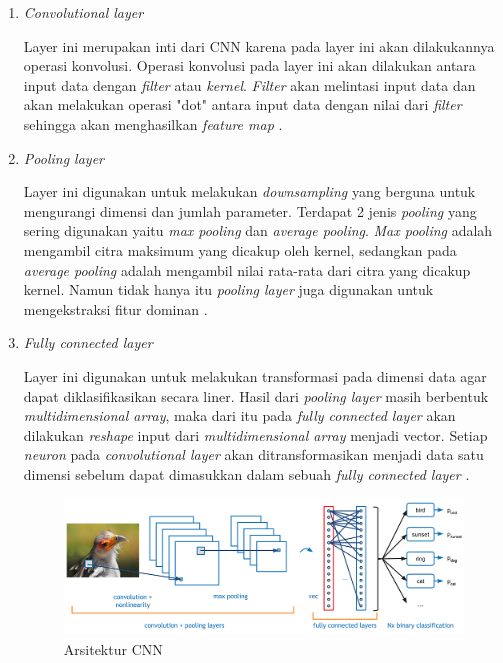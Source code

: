 \begin{enumerate}
  \item \textit{Convolutional layer} \par
  Layer ini merupakan inti dari CNN karena pada layer ini akan dilakukannya operasi konvolusi. Operasi konvolusi pada layer ini akan dilakukan antara input data dengan \textit{filter} atau \textit{kernel}. \textit{Filter} akan melintasi input data dan akan melakukan operasi "dot" antara input data dengan nilai dari \textit{filter} sehingga akan menghasilkan \textit{feature map} \parencite{LinaQ}.
  
  \item \textit{Pooling layer} \par
  Layer ini digunakan untuk melakukan \textit{downsampling} yang berguna untuk mengurangi dimensi dan jumlah parameter. Terdapat 2 jenis \textit{pooling} yang sering digunakan yaitu \textit{max pooling} dan  \textit{average pooling}. \textit{Max pooling} adalah mengambil citra maksimum yang dicakup oleh kernel, sedangkan pada \textit{average pooling} adalah mengambil nilai rata-rata dari citra yang dicakup kernel.
  Namun tidak hanya itu \textit{pooling layer} juga digunakan untuk mengekstraksi fitur dominan \parencite{Bukusakti}. 

  \item \textit{Fully connected layer} \par
  Layer ini digunakan untuk melakukan transformasi pada dimensi data agar dapat diklasifikasikan secara liner.
  Hasil dari \textit{pooling layer} masih berbentuk \textit{multidimensional array}, maka dari itu pada \textit{fully connected layer} akan dilakukan \textit{reshape} input dari \textit{multidimensional array} menjadi vector. Setiap \textit{neuron} pada \textit{convolutional layer} akan ditransformasikan menjadi data satu dimensi sebelum dapat dimasukkan dalam sebuah \textit{fully connected layer} \parencite{JurnalTeknikITS}.

  \begin{figure}[!h]
    \centering
    \includegraphics[width=1\linewidth]{gambar/cnn.png}
    \caption{Arsitektur CNN \parencite{adit}}
    \label{fig:cnn}
  \end{figure}

\end{enumerate} 

